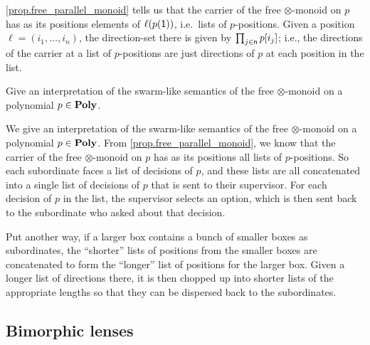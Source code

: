 \documentclass[Book-Poly]{subfiles}
\begin{document}
\cref{prop.free_parallel_monoid} tells us that the carrier of the free $\otimes$-monoid on $p$ has as its positions elements of $\ell(p(\textsf{1}))$, i.e.\ lists of $p$-positions.
Given a position $\ell=(i_1,\ldots,i_n)$, the direction-set there is given by $\prod_{j\in\mathsf{n}} p[i_j]$; i.e., the directions of the carrier at a list of $p$-positions are just directions of $p$ at each position in the list.

\begin{exercise}
Give an interpretation of the swarm-like semantics of the free $\otimes$-monoid on a polynomial $p\in\mathbf{Poly}$.
\begin{solution}
We give an interpretation of the swarm-like semantics of the free $\otimes$-monoid on a polynomial $p\in\mathbf{Poly}$.
From \cref{prop.free_parallel_monoid}, we know that the carrier of the free $\otimes$-monoid on $p$ has as its positions all lists of $p$-positions.
So each subordinate faces a list of decisions of $p$, and these lists are all concatenated into a single list of decisions of $p$ that is sent to their supervisor.
For each decision of $p$ in the list, the supervisor selects an option, which is then sent back to the subordinate who asked about that decision.


Put another way, if a larger box contains a bunch of smaller boxes as subordinates, the ``shorter'' lists of positions from the smaller boxes are concatenated to form the ``longer'' list of positions for the larger box.
Given a longer list of directions there, it is then chopped up into shorter lists of the appropriate lengths so that they can be dispersed back to the subordinates.
\end{solution}
\end{exercise}


\subsection{Bimorphic lenses}\label{subsec.poly.func_nat.prepare_dyn.bimorphic_lens}
\end{document}
